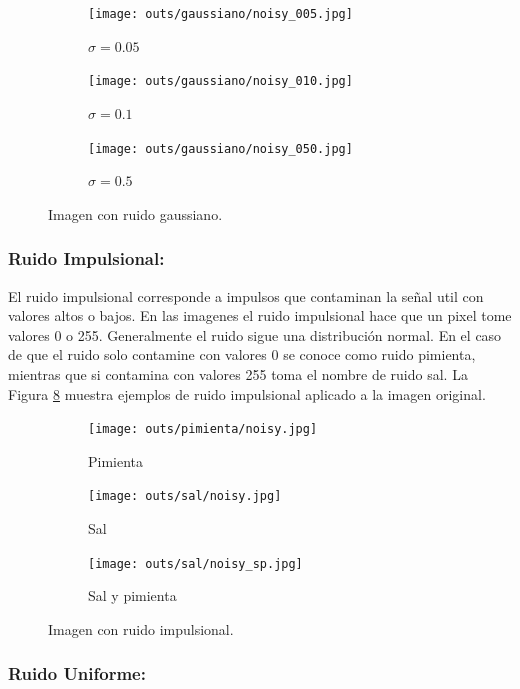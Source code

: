 \documentclass[
  letterpaper,
  twocolumn,
  9pt,
  journal,
  final]{IEEEtran}
\begin{document}
\begin{figure}[!tbh]
  \centering
  \begin{subfigure}[b]{.32\linewidth}
    \texttt{[image: outs/gaussiano/noisy\_005.jpg]}
    \caption{$\sigma=0.05$}\label{gauss_0.05}
  \end{subfigure}
  \begin{subfigure}[b]{.32\linewidth}
    \texttt{[image: outs/gaussiano/noisy\_010.jpg]}
    \caption{$\sigma=0.1$}\label{gauss_0.10}
  \end{subfigure}
  \begin{subfigure}[b]{.32\linewidth}
    \texttt{[image: outs/gaussiano/noisy\_050.jpg]}
    \caption{$\sigma=0.5$}\label{lata_gauss_0.50}
  \end{subfigure}
  \caption{Imagen con ruido gaussiano.}
  \label{gauss}
\end{figure}

\subsubsection{Ruido Impulsional:}
El ruido impulsional corresponde a impulsos que contaminan la señal util con valores altos o bajos. En las imagenes el ruido impulsional hace que un pixel tome valores 0 o 255. Generalmente el ruido sigue una distribución normal. En el caso de que el ruido solo contamine con valores 0 se conoce como ruido pimienta, mientras que si contamina con valores 255 toma el nombre de ruido sal. La Figura \ref{impulsional} muestra ejemplos de ruido impulsional aplicado a la imagen original.

\begin{figure}[!tbh]
  \centering
  \begin{subfigure}[b]{.32\linewidth}
    \texttt{[image: outs/pimienta/noisy.jpg]}
    \caption{Pimienta}\label{pimienta}
  \end{subfigure}
  \begin{subfigure}[b]{.32\linewidth}
    \texttt{[image: outs/sal/noisy.jpg]}
    \caption{Sal}\label{sal}
  \end{subfigure}
  \begin{subfigure}[b]{.32\linewidth}
    \texttt{[image: outs/sal/noisy\_sp.jpg]}
    \caption{Sal y pimienta}\label{sal_pimienta}
  \end{subfigure}
  \caption{Imagen con ruido impulsional.}
  \label{impulsional}
\end{figure}

\subsubsection{Ruido Uniforme:}
\end{document}
